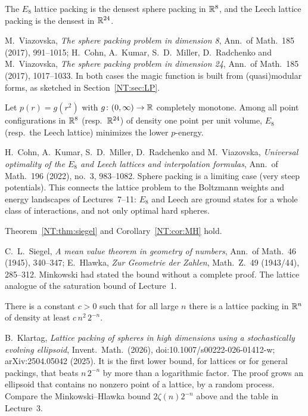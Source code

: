 \begin{theorem}\label{NT:gal:viazovska}
The $E_8$ lattice packing is the densest sphere packing in $\mathbb{R}^8$, and the Leech lattice packing is the
densest in $\mathbb{R}^{24}$.
\end{theorem}
M.~Viazovska, \emph{The sphere packing problem in dimension 8}, Ann.\ of Math.\ 185 (2017), 991--1015;
H.~Cohn, A.~Kumar, S.~D.~Miller, D.~Radchenko and M.~Viazovska, \emph{The sphere packing problem in dimension
24}, Ann.\ of Math.\ 185 (2017), 1017--1033. In both cases the magic function is built from (quasi)modular
forms, as sketched in Section~\ref{NT:sec:LP}.

\begin{theorem}\label{NT:gal:universal}
Let $p(r)=g(r^2)$ with $g\colon(0,\infty)\to\mathbb{R}$ completely monotone. Among all point configurations in $\mathbb{R}^8$
(resp.\ $\mathbb{R}^{24}$) of density one point per unit volume, $E_8$ (resp.\ the Leech lattice) minimizes the
lower $p$-energy.
\end{theorem}
H.~Cohn, A.~Kumar, S.~D.~Miller, D.~Radchenko and M.~Viazovska, \emph{Universal optimality of the $E_8$ and
Leech lattices and interpolation formulas}, Ann.\ of Math.\ 196 (2022), no.~3, 983--1082. Sphere packing is
a limiting case (very steep potentials). This connects the lattice problem to the Boltzmann weights and
energy landscapes of Lectures~7--11: $E_8$ and Leech are ground states for a whole class of interactions,
and not only optimal hard spheres.

\begin{theorem}\label{NT:gal:siegel}
Theorem~\ref{NT:thm:siegel} and Corollary~\ref{NT:cor:MH} hold.
\end{theorem}
C.~L.~Siegel, \emph{A mean value theorem in geometry of numbers}, Ann.\ of Math.\ 46 (1945), 340--347;
E.~Hlawka, \emph{Zur Geometrie der Zahlen}, Math.\ Z.\ 49 (1943/44), 285--312. Minkowski had stated the bound
without a complete proof. The lattice analogue of the saturation bound of Lecture~1.

\begin{theorem}[Klartag 2025]\label{NT:gal:klartag}
There is a constant $c>0$ such that for all large $n$ there is a lattice packing in $\mathbb{R}^n$ of density at least
$c\,n^2\,2^{-n}$.
\end{theorem}
B.~Klartag, \emph{Lattice packing of spheres in high dimensions using a stochastically evolving ellipsoid},
Invent.\ Math.\ (2026), doi:10.1007/s00222-026-01412-w; arXiv:2504.05042 (2025). It is the first lower bound, for lattices or for general packings, that beats
$n\,2^{-n}$ by more than a logarithmic factor. The proof grows an ellipsoid that contains no nonzero point
of a lattice, by a random process. Compare the Minkowski--Hlawka bound
$2\zeta(n)2^{-n}$ above and the table in Lecture~3.

